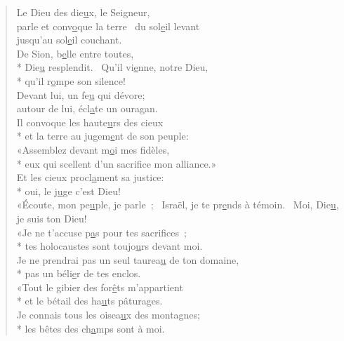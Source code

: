 
\begin{verse}
Le Dieu des die\underline{u}x, le Seigneur, \\
parle et conv\underline{o}que la terre~\psalmstar
du sol\underline{e}il levant \\
jusqu’au sol\underline{e}il couchant. \\

De Sion, b\underline{e}lle entre toutes, \\*
Die\underline{u} resplendit.~\psalmstar
{}Qu’il vi\underline{e}nne, notre Dieu, \\*
qu’il r\underline{o}mpe son silence! \\

Devant lui, un fe\underline{u} qui dévore; \\
autour de lui, écl\underline{a}te un ouragan. \\
Il convoque les haute\underline{u}rs des cieux \\*
et la terre au jugem\underline{e}nt de son peuple: \\

«Assemblez devant m\underline{o}i mes fidèles, \\*
eux qui scellent d’un sacrif\underline{i}ce mon alliance.» \\
Et les cieux procl\underline{a}ment sa justice: \\*
oui, le j\underline{u}ge c’est Dieu! \\

«Écoute, mon pe\underline{u}ple, je parle ;~\psalmdagger
Israël, je te pr\underline{e}nds à témoin.~\psalmstar
Moi, Die\underline{u}, je suis ton Dieu! \\

«Je ne t’accuse p\underline{a}s pour tes sacrifices ; \\*
tes holocaustes sont toujo\underline{u}rs devant moi. \\
Je ne prendrai pas un seul taurea\underline{u} de ton domaine, \\*
pas un béli\underline{e}r de tes enclos. \\

«Tout le gibier des for\underline{ê}ts m’appartient \\*
et le bétail des ha\underline{u}ts pâturages. \\
Je connais tous les oisea\underline{u}x des montagnes; \\*
les bêtes des ch\underline{a}mps sont à moi. \\


\end{verse}

